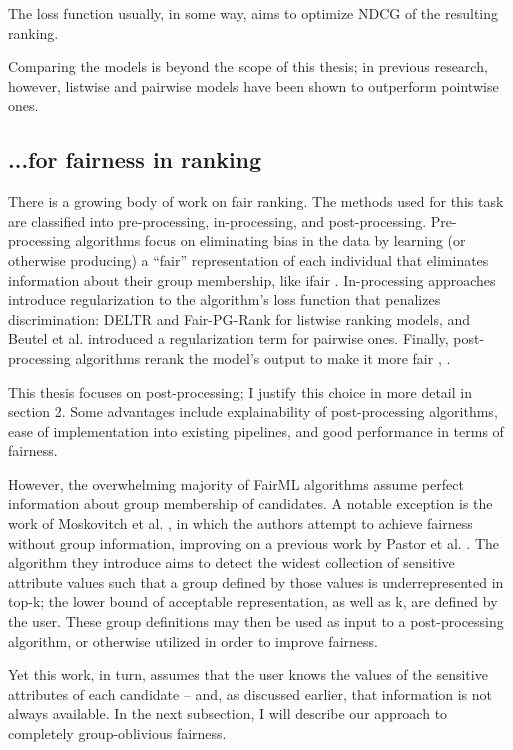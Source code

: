The loss function usually, in some way, aims to optimize NDCG of the resulting ranking.

Comparing the models is beyond the scope of this thesis; in previous research, however, listwise \cite{10.1145/2866571} and pairwise \cite{RankNet} models have been shown to outperform pointwise ones.

\subsection{...for fairness in ranking}

There is a growing body of work on fair ranking. The methods used for this task are classified into pre-processing, in-processing, and post-processing. Pre-processing algorithms focus on eliminating bias in the data by learning (or otherwise producing) a “fair” representation of each individual that eliminates information about their group membership, like ifair \cite{ifair}. In-processing approaches introduce regularization to the algorithm’s loss function that penalizes discrimination: DELTR \cite{DELTR} and Fair-PG-Rank \cite{fpgrank} for listwise ranking models, and Beutel et al. \cite{beutelpairwise} introduced a regularization term for pairwise ones. Finally, post-processing algorithms rerank the model’s output to make it more fair \cite{linkedin}, \cite{RAPF}.

This thesis focuses on post-processing; I justify this choice in more detail in section 2. Some advantages include explainability of post-processing algorithms, ease of implementation into existing pipelines, and good performance in terms of fairness.

However, the overwhelming majority of FairML algorithms assume perfect information about group membership of candidates. A notable exception is the work of Moskovitch et al. \cite{detectionofgroups}, in which the authors attempt to achieve fairness without group information, improving on a previous work by Pastor et al. \cite{https://arxiv.org/abs/2108.07450}. The algorithm they introduce aims to detect the widest collection of sensitive attribute values such that a group defined by those values is underrepresented in top-k; the lower bound of acceptable representation, as well as k, are defined by the user. These group definitions may then be used as input to a post-processing algorithm, or otherwise utilized in order to improve fairness.

Yet this work, in turn, assumes that the user knows the values of the sensitive attributes of each candidate – and, as discussed earlier, that information is not always available. In the next subsection, I will describe our approach to completely group-oblivious fairness.


